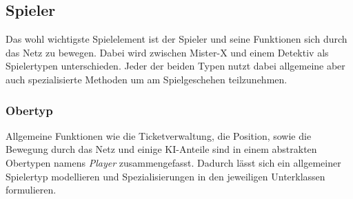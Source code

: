         \subsection{Spieler}

            Das wohl wichtigste Spielelement ist der Spieler und seine Funktionen sich durch das Netz zu bewegen.
            Dabei wird zwischen Mister-X und einem Detektiv als Spielertypen unterschieden.
            Jeder der beiden Typen nutzt dabei allgemeine aber auch spezialisierte Methoden um am Spielgeschehen teilzunehmen.
            
            \subsubsection{Obertyp}
                Allgemeine Funktionen wie die Ticketverwaltung, die Position, sowie die Bewegung durch das Netz und einige KI-Anteile sind
                in einem abstrakten Obertypen namens \textit{Player} zusammengefasst.
                Dadurch lässt sich ein allgemeiner Spielertyp modellieren und Spezialisierungen in den jeweiligen Unterklassen formulieren.
                \newline
                \newline
